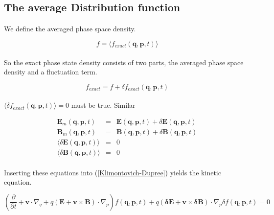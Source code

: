\documentclass[a4paper,10pt]{report}
\begin{document}
\subsection{The average Distribution function}
\paragraph*{}
We define the averaged phase space density.

\begin{equation}\label{f_av}
    f=\langle f_{exact}(\mathbf{q,p},t) \rangle
\end{equation}

\paragraph*{}
So the exact phase state density consists of two parts, the averaged phase space density and a fluctuation term.

\begin{equation}\label{f_exact}
    f_{exact}=f+ \delta f_{exact}(\mathbf{q,p},t)
\end{equation}

\paragraph*{}
$\langle \delta f_{exact}(\mathbf{q,p},t) \rangle =0$ must be true. Similar

\begin{eqnarray}
  \mathbf{E}_m(\mathbf{q,p},t) &=& \mathbf{E}(\mathbf{q,p},t)+\delta \mathbf{E}(\mathbf{q,p},t) \\
 \mathbf{B}_m (\mathbf{q,p},t)&=& \mathbf{B}(\mathbf{q,p},t)+\delta \mathbf{B}(\mathbf{q,p},t) \\
\langle \delta \mathbf{E}(\mathbf{q,p},t) \rangle &=& 0 \\
\langle \delta \mathbf{B}(\mathbf{q,p},t) \rangle &=& 0\end{eqnarray}

\paragraph*{}
Inserting these equations into (\ref{Klimontovich-Dupree}) yields the kinetic equation.

\begin{equation}\label{kinetic_equation}
    \left( \frac{\partial}{\partial t} + \mathbf{v}\cdot \nabla_q+q(\mathbf{E}+\mathbf{v}\times \mathbf{B})\cdot\nabla_p \right) f(\mathbf{q,p},t)+ q(\mathbf{\delta E}+\mathbf{v}\times \mathbf{\delta B})\cdot\nabla_p \delta f(\mathbf{q,p},t)=0
\end{equation}
\end{document}
